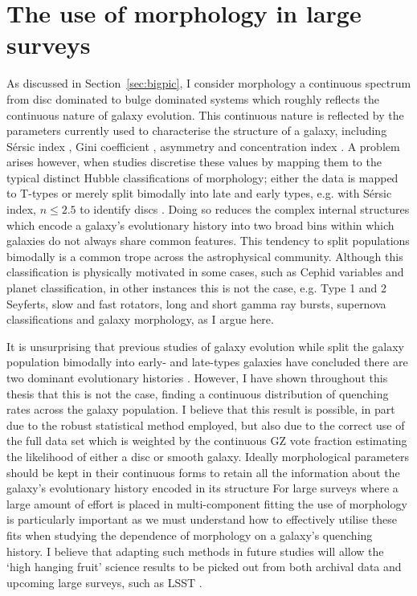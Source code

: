 \section{The use of morphology in large surveys}\label{sec:usemorph}

As discussed in Section~\ref{sec:bigpic}, I consider morphology a continuous spectrum from disc dominated to bulge dominated systems which roughly reflects the continuous nature of galaxy evolution. This continuous nature is reflected by the parameters currently used to characterise the structure of a galaxy, including S\'ersic index \citep{sersic68}, Gini coefficient \citep{abraham03, lotz04}, asymmetry \citep{conselice00} and concentration index \citep{morgan58}. A problem arises however, when studies discretise these values by mapping them to the typical distinct Hubble classifications of morphology; either the data is mapped to T-types \citep{shimasaku01, brinchmann04, barro15} or merely split bimodally into late and early types, e.g. with S\'ersic index, $n \leq 2.5$ to identify discs \citep{ravindranath04, kelvin12, vika15}. Doing so reduces the complex internal structures which encode a galaxy's evolutionary history into two broad bins within which galaxies do not always share common features. This tendency to split populations bimodally is a common trope across the astrophysical community. Although this classification is physically motivated in some cases, such as Cephid variables and planet classification, in other instances this is not the case, e.g. Type 1 and 2 Seyferts, slow and fast rotators, long and short gamma ray bursts, supernova classifications and galaxy morphology, as I argue here. 

It is unsurprising that previous studies of galaxy evolution while split the galaxy population bimodally into early- and late-types galaxies have concluded there are two dominant evolutionary histories \citep[e.g.][]{schawinski14, casado15, belfiore16}. However, I have shown throughout this thesis that this is not the case, finding a continuous distribution of quenching rates across the galaxy population. I believe that this result is possible, in part due to the robust statistical method employed, but also due to the correct use of the full data set which is weighted by the continuous GZ vote fraction estimating the likelihood of either a disc or smooth galaxy. Ideally morphological parameters should be kept in their continuous forms to retain all the information about the galaxy's evolutionary history encoded in its structure \citep[e.g. see work by][]{peth16, savorgnan16, krywult16} For large surveys where a large amount of effort is placed in multi-component fitting \citep{haussler07, haussler11, haussler13, simard11, bruce14, vika15, johnston16} the use of morphology is particularly important as we must understand how to effectively utilise these fits when studying the dependence of morphology on a galaxy's quenching history. I believe that adapting such methods in future studies will allow the `high hanging fruit' science results to be picked out from both archival data and upcoming large surveys, such as LSST \citep{ivezic08}. 



